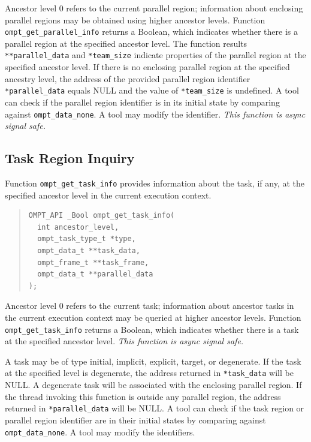 \documentclass{article}
\begin{document}
\noindent 
Ancestor level 0 refers to the current parallel region; 
information about enclosing parallel regions may be obtained using higher ancestor levels. 
Function \verb|ompt_get_parallel_info| returns a Boolean, which indicates whether there is a parallel region at the specified ancestor level.
The function results \verb|**parallel_data| and \verb|*team_size| indicate properties of the parallel region at the specified ancestor level.
If there is no enclosing parallel region at the specified ancestry level, the address of the provided parallel region identifier \verb|*parallel_data| equals NULL and the value of \verb|*team_size| is undefined.
A tool can check if the parallel region identifier is in its initial state by comparing against \verb|ompt_data_none|.
A tool may modify the identifier.
{\em This function is async signal safe.}
 
\subsection{Task Region Inquiry}
\label{sec:task-region}

Function \verb|ompt_get_task_info| provides information about the task, if any, at the specified ancestor level in the current execution context.

\begin{quote}
\begin{verbatim}
OMPT_API _Bool ompt_get_task_info(
  int ancestor_level,
  ompt_task_type_t *type,
  ompt_data_t **task_data,
  ompt_frame_t **task_frame,
  ompt_data_t **parallel_data
);
\end{verbatim}
\end{quote}
\noindent
Ancestor level 0 refers to the current task; information about ancestor tasks in the current execution context may be queried at higher ancestor levels. 
Function \verb|ompt_get_task_info| returns a Boolean, which indicates whether there is a task at the specified ancestor level.
{\em This function is async signal safe.} 

A task may be of type initial, implicit, explicit,  target, or degenerate. 
If the task at the specified level is degenerate, the address returned in \verb|*task_data| will be NULL.
A degenerate task will be associated with the enclosing parallel region. 
If the thread invoking this function is outside any parallel region, the address returned in \verb|*parallel_data| will be NULL.
A tool can check if the task region or parallel region identifier are in their initial states by comparing against \verb|ompt_data_none|.
A tool may modify the identifiers.
\end{document}
